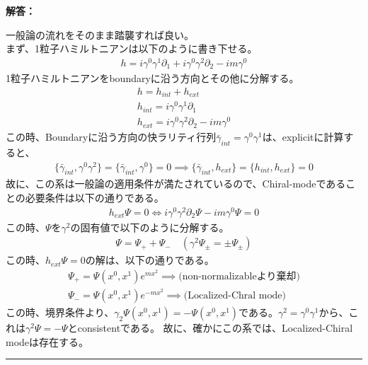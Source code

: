 \documentclass[dvipdfmx,a4paper,10.5pt]{article}
\numberwithin{equation}{section}
\newenvironment{answerbox}
{\begin{prooflabel}\textbf{解答：}\end{prooflabel}\vspace{0.8em}}
{\par\vspace{1em}\hrule\vspace{1em}}
\begin{document}
\begin{answerbox}
    一般論の流れをそのまま踏襲すれば良い。\\
    まず、1粒子ハミルトニアンは以下のように書き下せる。
    \begin{align*}
        h=i\gamma^{0}\gamma^{1}\partial_{1}+i\gamma^{0}\gamma^{2}\partial_{2}-im\gamma^{0}
    \end{align*}
    1粒子ハミルトニアンをboundaryに沿う方向とその他に分解する。
    \begin{gather*}
        h=h_{int}+h_{ext}\\
        h_{int}=i\gamma^{0}\gamma^{1}\partial_{1}\\
        h_{ext}=i\gamma^{0}\gamma^{2}\partial_{2}-im\gamma^{0}
    \end{gather*}
    この時、Boundaryに沿う方向の快ラリティ行列$\bar{\gamma}_{int}=\gamma^{0}\gamma^{1}$は、explicitに計算すると、
    \begin{gather*}
        \{\bar{\gamma}_{int},\gamma^{0}\gamma^{2}\}=\{\bar{\gamma}_{int},\gamma^{0}\}=0
        \implies  \{\bar{\gamma}_{int},h_{ext}\}=\{h_{int},h_{ext}\}=0
    \end{gather*}
    故に、この系は一般論の適用条件が満たされているので、Chiral-modeであることの必要条件は以下の通りである。
    \begin{align*}
        h_{ext}\Psi=0 \iff i\gamma^{0}\gamma^{2}\partial_{2}\Psi -im\gamma^{0}\Psi=0
    \end{align*}
    この時、$\Psi$を$\gamma^{2}$の固有値で以下のように分解する。
    \begin{align*}
        \Psi = \Psi_{+}+\Psi_{-}\quad (\gamma^{2}\Psi_{\pm}=\pm\Psi_{\pm})
    \end{align*}
    この時、$h_{ext}\Psi=0$の解は、以下の通りである。
    \begin{align*}
        \Psi_{+}=\Psi(x^{0},x^{1})e^{mx^{2}} \implies \text{(non-normalizableより棄却)}\\
        \Psi_{-}=\Psi(x^{0},x^{1})e^{-mx^{2}}\implies \text{(Localized-Chral mode)}
    \end{align*}
    この時、境界条件より、$\gamma_{2}\Psi(x^{0},x^{1})=-\Psi(x^{0},x^{1})$である。$\gamma^{2}=\gamma^{0}\gamma^{1}$から、これは$\gamma^{2}\Psi=-\Psi$とconsistentである。
    故に、確かにこの系では、Localized-Chiral modeは存在する。 
\end{answerbox}
\end{document}

